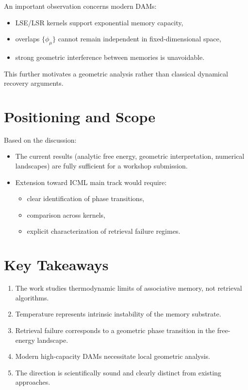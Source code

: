 \documentclass[11pt,a4paper]{article}
\begin{document}
An important observation concerns modern DAMs:

\begin{itemize}
    \item LSE/LSR kernels support exponential memory capacity,
    \item overlaps $\{\phi_\mu\}$ cannot remain independent in fixed-dimensional space,
    \item strong geometric interference between memories is unavoidable.
\end{itemize}

This further motivates a geometric analysis rather than classical dynamical recovery arguments.

\section{Positioning and Scope}

Based on the discussion:

\begin{itemize}
    \item The current results (analytic free energy, geometric interpretation, numerical landscapes) are fully sufficient for a workshop submission.
    \item Extension toward ICML main track would require:
    \begin{itemize}
        \item clear identification of phase transitions,
        \item comparison across kernels,
        \item explicit characterization of retrieval failure regimes.
    \end{itemize}
\end{itemize}

\section*{Key Takeaways}

\begin{enumerate}
    \item The work studies thermodynamic limits of associative memory, not retrieval algorithms.
    \item Temperature represents intrinsic instability of the memory substrate.
    \item Retrieval failure corresponds to a geometric phase transition in the free-energy landscape.
    \item Modern high-capacity DAMs necessitate local geometric analysis.
    \item The direction is scientifically sound and clearly distinct from existing approaches.
\end{enumerate}
\end{document}
